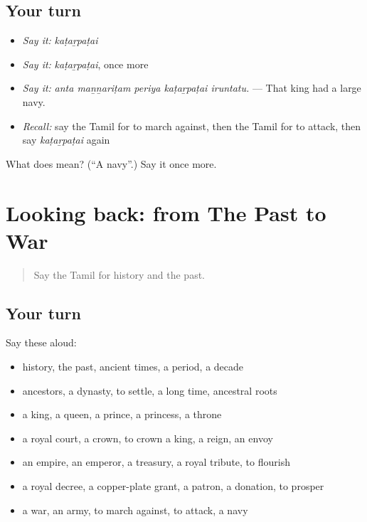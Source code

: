 \subsection*{Your turn}
\begin{itemize}
\raggedright
  \item \emph{Say it:} \emph{kaṭaṟpaṭai}
  \item \emph{Say it:} \emph{kaṭaṟpaṭai}, once more
  \item \emph{Say it:} \emph{anta maṉṉariṭam periya kaṭaṟpaṭai iruntatu.} — That king had a large navy.
  \item \emph{Recall:} say the Tamil for to march against, then the Tamil for to attack, then say \emph{kaṭaṟpaṭai} again
\end{itemize}

\begin{tcolorbox}[breakable,colback=teal!4,colframe=teal!35!black,title={Before you move on}]
What does  mean? (\textquotedblleft{}A navy\textquotedblright{}.) Say it once more.
\end{tcolorbox}
\section[(dialogue)]{Looking back: from The Past to War}

\label{lesson:TA-R332-review-326-332}



\begin{quote}
Say the Tamil for history and the past.
\end{quote}

\subsection*{Your turn}
Say these aloud:

\begin{itemize}
\raggedright
  \item history, the past, ancient times, a period, a decade
  \item ancestors, a dynasty, to settle, a long time, ancestral roots
  \item a king, a queen, a prince, a princess, a throne
  \item a royal court, a crown, to crown a king, a reign, an envoy
  \item an empire, an emperor, a treasury, a royal tribute, to flourish
  \item a royal decree, a copper-plate grant, a patron, a donation, to prosper
  \item a war, an army, to march against, to attack, a navy
\end{itemize}

